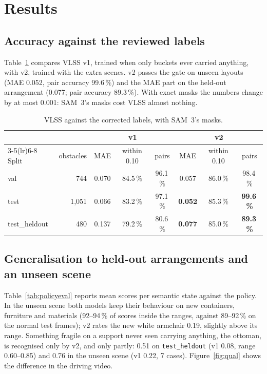 \documentclass[10pt,a4paper]{article}
\newcommand{\code}[1]{\texttt{#1}}
\begin{document}
\section{Results}\label{sec:results}

\subsection{Accuracy against the reviewed labels}
Table~\ref{tab:labels} compares VLSS v1, trained when only buckets ever carried anything, with v2, trained with the extra scenes. v2
passes the gate on unseen layouts (MAE 0.052, pair accuracy 99.6\,\%) and the MAE part on the held-out arrangement (0.077; pair
accuracy 89.3\,\%). With exact masks the numbers change by at most 0.001: SAM~3's masks cost VLSS almost nothing.

\begin{table}[htbp]
\centering\small
\caption{VLSS against the corrected labels, with SAM~3's masks.}
\label{tab:labels}
\begin{tabular}{lrcccccc}
\toprule
 & & \multicolumn{3}{c}{v1} & \multicolumn{3}{c}{v2} \\
\cmidrule(lr){3-5}\cmidrule(lr){6-8}
Split & obstacles & MAE & within 0.10 & pairs & MAE & within 0.10 & pairs \\
\midrule
val & 744 & 0.070 & 84.5\,\% & 96.1\,\% & 0.057 & 86.0\,\% & 98.4\,\% \\
test & 1{,}051 & 0.066 & 83.2\,\% & 97.1\,\% & \textbf{0.052} & 85.3\,\% & \textbf{99.6\,\%} \\
test\_heldout & 480 & 0.137 & 79.2\,\% & 80.6\,\% & \textbf{0.077} & 85.0\,\% & \textbf{89.3\,\%} \\
\bottomrule
\end{tabular}
\end{table}

\subsection{Generalisation to held-out arrangements and an unseen scene}
Table~\ref{tab:policyeval} reports mean scores per semantic state against the policy. In the unseen scene both models keep their
behaviour on new containers, furniture and materials (92--94\,\% of scores inside the ranges, against 89--92\,\% on the normal test
frames); v2 rates the new white armchair 0.19, slightly above its range. Something fragile on a support never seen carrying anything,
the ottoman, is recognised only by v2, and only partly: 0.51 on \code{test\_heldout} (v1 0.08, range 0.60--0.85) and 0.76 in the
unseen scene (v1 0.22, 7 cases). Figure~\ref{fig:qual} shows the difference in the driving video.
\end{document}
